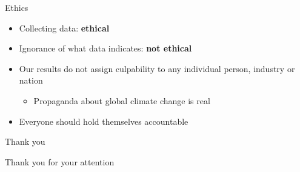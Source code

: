 \documentclass[9pt]{beamer}
\begin{document}
\begin{frame}{Ethics}

    \begin{itemize}
        \item Collecting data: \textbf{ethical}
        \item Ignorance of what data indicates: \textbf{not ethical}
        \item Our results do not assign culpability to any individual person, industry or nation
        \begin{itemize}
            \item Propaganda about global climate change is real
        \end{itemize}
        \item Everyone should hold themselves accountable
    \end{itemize}

\end{frame}

\begin{frame}{Thank you}
    \begin{center}
        \Huge Thank you for your attention
    \end{center}
\end{frame}
\end{document}
